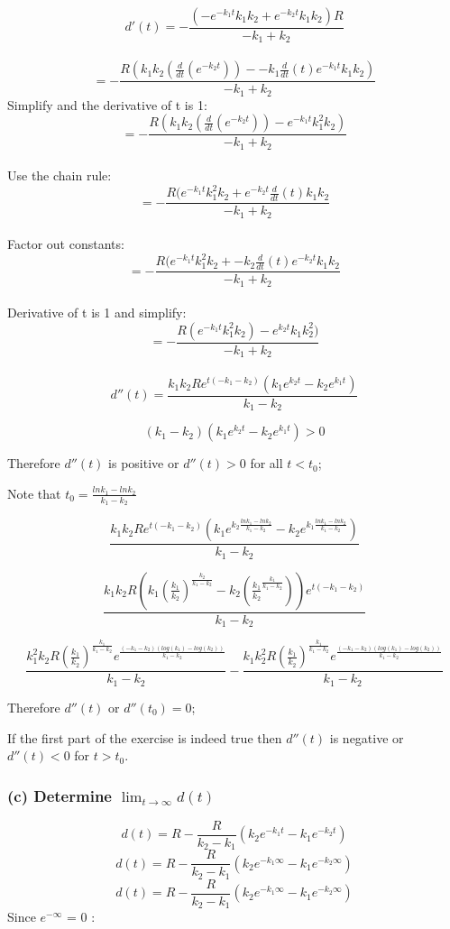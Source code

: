 \documentclass[]{article}
\begin{document}
\[d'(t) = -\frac{(-e^{-k_1 t}k_1 k_2 + e^{-k_2 t}k_1 k_2)R}{-k_1 + k_2}\]\\
\[= -\frac{R(k_1 k_2 (\frac{d}{dt}(e^{-k_2 t})) - -k_1 \frac{d}{dt}(t)e^{-k_1 t}k_1 k_2 )}{-k_1 + k_2}\]
Simplify and the derivative of t is 1:
\[= -\frac{R(k_1 k_2 (\frac{d}{dt}(e^{-k_2 t})) - e^{-k_1 t}k_1^2 k_2 )}{-k_1 + k_2}\]\\
Use the chain rule:
\[= -\frac{R(e^{-k_1 t}k_1^2 k_2 + e^{-k_2 t} \frac{d}{dt}(t)k_1 k_2 }{-k_1 + k_2}\]\\
Factor out constants:
\[= -\frac{R(e^{-k_1 t}k_1^2 k_2 + - k_2 \frac{d}{dt}(t) e^{-k_2 t}k_1 k_2} {-k_1 + k_2}\]\\
Derivative of t is 1 and simplify:
\[= - \frac{R (e^{-k_1 t}k_1^2 k_2) - e^{k_2 t} k_1 k_2^2)}{-k_1 + k_2}\]\\
\[d''(t) = \frac{k_1 k_2 R e^{t(-k_1-k_2)}(k_1 e^{k_2 t}-k_2 e^{k_1 t})}{k_1 - k_2}\]

\[(k_1 - k_2)(k_1 e ^{k_2 t}-k_2 e^{k_1 t}) > 0\]

Therefore \(d''(t)\) is positive or \(d''(t) > 0\) for all \(t < t_0\);

Note that \(t_0 = \frac{ln k_1 - ln k_2}{k_1 - k_2}\)

\[\frac{k_1 k_2 R e^{t(-k_1-k_2)}(k_1 e^{k_2 \frac{ln k_1 - ln k_2}{k_1 - k_2}}-k_2 e^{k_1 \frac{ln k_1 - ln k_2}{k_1 - k_2}})}{k_1 - k_2}\]

\[\frac{k_1 k_2 R(k_1 (\frac{k_1}{k_2})^{\frac{k_2}{k_1 - k_2}}-k_2(\frac{k_1}{k_2}^{\frac{k_1}{k_1 - k_2}}))e^{t(-k_1 - k_2)}}{k_1 - k_2}\]

\[\frac{k_1^2 k_2 R (\frac{k_1}{k_2})^{\frac{k_1}{k_1 - k_2}}e^{\frac{(-k_1 - k_2)(log(k_1) - log(k_2))}{k_1 - k_2}}}{k_1 - k_2} - \frac{k_1 k_2^2 R (\frac{k_1}{k_2})^{\frac{k_1}{k_1 - k_2}}e^{\frac{(-k_1 - k_2)(log(k_1) - log(k_2))}{k_1 - k_2}}}{k_1 - k_2}\]

Therefore \(d''(t)\) or \(d''(t_0) =0\);

If the first part of the exercise is indeed true then \(d''(t)\) is
negative or \(d''(t) < 0\) for \(t > t_0\).

\subsubsection{\texorpdfstring{(c) Determine
\(\lim_{t\to\infty}d(t)\)}{(c) Determine \textbackslash{}lim\_\{t\textbackslash{}to\textbackslash{}infty\}d(t)}}\label{c-determine-lim_ttoinftydt}

\[d(t) = R - \frac{R}{k_2 - k_1}(k_2 e ^{-k_1 t} - k_1 e^{-k_2 t})\]
\[d(t) = R - \frac{R}{k_2 - k_1}(k_2 e ^{-k_1 \infty} - k_1 e^{-k_2 \infty})\]
\[d(t) = R - \frac{R}{k_2 - k_1}(k_2 e ^{-k_1 \infty} - k_1 e^{-k_2 \infty})\]
Since \(e^{-\infty}\) = 0 :
\end{document}
